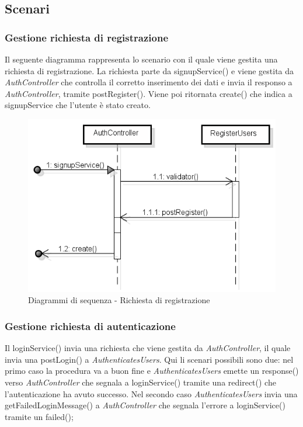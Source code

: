 \subsection{Scenari}
	\subsubsection{Gestione richiesta di registrazione}
	Il seguente diagramma rappresenta lo scenario con il quale viene gestita una richiesta di registrazione. La richiesta parte da signupService() e viene gestita da \textit{AuthController} che controlla il corretto inserimento dei dati e invia il responso a \textit{AuthController}, tramite postRegister(). Viene poi ritornata create() che indica a signupService che l'utente è stato creato.
	\begin{figure}[H]
		\centering
		\includegraphics[scale=0.5]{img/register.png}
		\caption{Diagrammi di sequenza - Richiesta di registrazione}
	\end{figure}

\newpage
	\subsubsection{Gestione richiesta di autenticazione}
	Il loginService() invia una richiesta che viene gestita da \textit{AuthController}, il quale invia una postLogin() a \textit{AuthenticatesUsers}. Qui li scenari possibili sono due: nel primo caso la procedura va a buon fine e \textit{AuthenticatesUsers} emette un response() verso \textit{AuthController} che segnala a loginService() tramite una redirect() che l'autenticazione ha avuto successo. Nel secondo caso \textit{AuthenticatesUsers} invia una getFailedLoginMessage() a \textit{AuthController} che segnala l'errore a loginService() tramite un failed();

